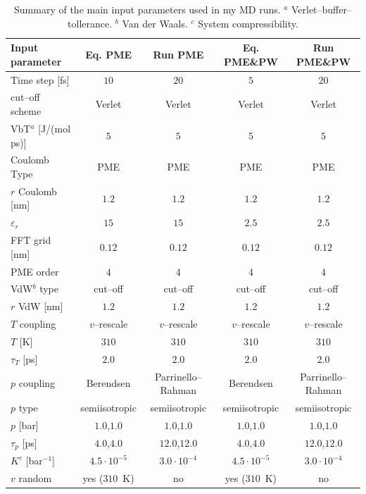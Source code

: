 \begin{table}[h!t]
	\centering\footnotesize
	\begin{tabular}{lcccc}
		\toprule
		Input parameter & Eq. \acs{PME} & Run \acs{PME} & Eq. \acs{PME}\&\acs{PW} & Run \acs{PME}\&\acs{PW} \\ \toprule
		Time step [fs]		&	$10$ & $20$ & $5$ & $20$ \\ \midrule
		cut--off scheme		& Verlet & Verlet & Verlet & Verlet \\ \midrule
		VbT$^a$ [J/(mol ps)]& $5$ & $5$ & $5$ & $5$ \\ \midrule
		Coulomb Type		& \acs{PME}	& \acs{PME}	& \acs{PME} & \acs{PME} \\ \midrule
		$r$ Coulomb	[nm]	& $1.2$ & $1.2$ & $1.2$ & $1.2$ \\ \midrule
		$\varepsilon_r$		& $15$ & $15$ & $2.5$ & $2.5$ \\ \midrule
		\acs{FFT} grid [nm]	& $0.12$ & $0.12$ & $0.12$ & $0.12$ \\ \midrule
	    \acs{PME} order		& $4$ & $4$ & $4$ & $4$ \\ \midrule
		VdW$^b$ type		& cut--off & cut--off & cut--off & cut--off \\ \midrule
		$r$ VdW [nm]		& $1.2$ & $1.2$ & $1.2$ & $1.2$ \\ \midrule
		$T$ coupling		& $v$--rescale & $v$--rescale & $v$--rescale & $v$--rescale \\ \midrule
		$T$ [K]				& $310$ & $310$ & $310$ & $310$  \\ \midrule
		$\tau_T$ [ps]		& $2.0$ & $2.0$ & $2.0$ & $2.0$ \\ \midrule
		$p$ coupling		& Berendsen & Parrinello--Rahman & Berendsen & Parrinello--Rahman \\ \midrule
		$p$ type			& semiisotropic & semiisotropic & semiisotropic & semiisotropic \\ \midrule
		$p$ [bar]			& $1.0$,$1.0$ & $1.0$,$1.0$ & $1.0$,$1.0$ & $1.0$,$1.0$ \\ \midrule
		$\tau_p$ [ps]		& $4.0$,$4.0$ & $12.0$,$12.0$ & $4.0$,$4.0$ & $12.0$,$12.0$ \\ \midrule
		$K^c$ [bar$^{-1}$]	& $4.5\cdot 10^{-5}$ & $3.0\cdot 10^{-4}$ & $4.5\cdot 10^{-5}$ & $3.0\cdot 10^{-4}$ \\ \midrule
		$v$ random			& yes ($310$~K) & no & yes ($310$~K) & no \\ \bottomrule 
	\end{tabular}
	\caption{Summary of the main input parameters used in my \acs{MD} runs. $^a$ Verlet--buffer--tollerance. $^b$ Van der Waals. $^c$ System compressibility.}
	\label{tab:inputParam}
\end{table}
